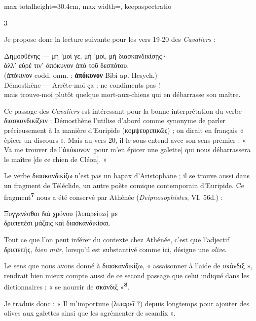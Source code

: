 \documentclass[11pt,twoside]{book}
\newcommand{\italique}[1]{\textit{#1}}
\newcommand{\citComm}[1]{\begin{quoting}[vskip=0.4pt,leftmargin=0.7em,rightmargin=0.2em]#1\end{quoting}}
\newcommand{\lecon}[1]{\textbf{#1}}
\newcommand{\marqueur}[1]{\textsuperscript{\color{rubricRed}\textbf{#1}}}
\begin{document}
\begin{adjustbox}{max totalheight=30.4cm, max width=\textwidth, keepaspectratio}
\begin{minipage}{\textwidth}
{\begin{multicols}{3}
\par\vspace{1.5pt}
\noindent Je propose donc la lecture suivante pour les vers 19-20 des \italique{Cavaliers} :
\citComm{Δημοσθένης --- μὴ 'μοί γε, μὴ 'μοί, μὴ διασκανδικίσῃς·\\
ἀλλ᾽ εὑρέ τιν᾽ ἀπόκυνον ἀπὸ τοῦ δεσπότου.\\
(ἀπόκινον codd. omn. : \lecon{ἀπόκυνον} Bibi ap. Hesych.)\\
Démosthène --- Arrête-moi ça : ne condiments pas !\\
mais trouve-moi plutôt quelque mort-aux-chiens qui en débarrasse son maître.}
\par\vspace{1.5pt}
\noindent Ce passage des \italique{Cavaliers} est intéressant pour la bonne interprétation du verbe διασκανδικίζειν : Démosthène l'utilise d'abord comme synonyme de parler précieusement à la manière d'Euripide (κομψευριπικῶς) ; on dirait en français « épicer un discours ».  Mais au vers 20, il le sous-entend avec son sens premier : « Va me trouver de l'ἀπόκυνον [pour m'en épicer une galette] qui nous débarrassera le maître [de ce chien de Cléon]. »
\par\vspace{1.5pt}
\noindent Le verbe διασκανδικίζω n'est pas un hapax d'Aristophane ; il se trouve aussi dans un fragment de Téléclide, un autre poète comique contemporain d'Euripide. Ce fragment\marqueur{7} nous a été conservé par Athénée (\italique{Deipnosophistes}, VI, 56d.) :
\citComm{Ξυγγενέσθαι διὰ χρόνου †λιπαρείτω† με\\
δρυπεπέσι μάζαις καὶ διασκανδικίσαι.}
\par\vspace{1.5pt}
\noindent Tout ce que l'on peut inférer du contexte chez Athénée, c'est que l'adjectif δρυπεπής, \italique{bien mûr}, lorsqu'il est substantivé comme ici, désigne une \italique{olive}.
\par\vspace{1.5pt}
\noindent Le sens que nous avons donné à διασκανδικίζω, « assaisonner à l'aide de σκάνδιξ », rendrait bien mieux compte aussi de ce second passage que celui indiqué dans les dictionnaires : « se nourrir de σκάνδιξ »\marqueur{8}.
\par\vspace{1.5pt}
\noindent Je traduis donc : « Il m'importune (λιπαρεῖ ?) depuis longtemps pour ajouter des olives aux galettes ainsi que les agrémenter de scandix ».
\par\vspace{1.5pt}

\end{multicols}}
\end{minipage}
\end{adjustbox}
\end{document}
